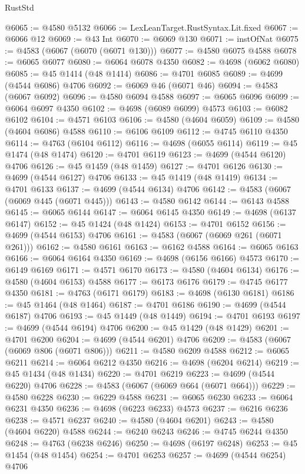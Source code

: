 \begin{lexlean}{RustStd}
\begin{coremodule}
@6065 := @4580 @5132
@6066 := LexLeanTarget.RustSyntax.Lit.fixed
@6067 := @6066 @12
@6069 := @43 Int
@6070 := @6069 @130
@6071 := instOfNat
@6075 := @4583 (@6067 (@6070 (@6071 @130)))
@6077 := @4580 @6075 @4588
@6078 := @6065 @6077
@6080 := @6064 @6078 @4350
@6082 := @4698 (@6062 @6080)
@6085 := @45 @1414 (@48 @1414)
@6086 := @4701 @6085
@6089 := @4699 (@4544 @6086) @4706
@6092 := @6069 @46 (@6071 @46)
@6094 := @4583 (@6067 @6092)
@6096 := @4580 @6094 @4588
@6097 := @6065 @6096
@6099 := @6064 @6097 @4350
@6102 := @4698 (@6089 @6099) @4573
@6103 := @6082 @6102
@6104 := @4571 @6103
@6106 := @4580 (@4604 @6059)
@6109 := @4580 (@4604 @6086) @4588
@6110 := @6106 @6109
@6112 := @4745 @6110 @4350
@6114 := @4763 (@6104 @6112)
@6116 := @4698 (@6055 @6114)
@6119 := @45 @1474 (@48 @1474)
@6120 := @4701 @6119
@6123 := @4699 (@4544 @6120) @4706
@6126 := @45 @1459 (@48 @1459)
@6127 := @4701 @6126
@6130 := @4699 (@4544 @6127) @4706
@6133 := @45 @1419 (@48 @1419)
@6134 := @4701 @6133
@6137 := @4699 (@4544 @6134) @4706
@6142 := @4583 (@6067 (@6069 @445 (@6071 @445)))
@6143 := @4580 @6142
@6144 := @6143 @4588
@6145 := @6065 @6144
@6147 := @6064 @6145 @4350
@6149 := @4698 (@6137 @6147)
@6152 := @45 @1424 (@48 @1424)
@6153 := @4701 @6152
@6156 := @4699 (@4544 @6153) @4706
@6161 := @4583 (@6067 (@6069 @261 (@6071 @261)))
@6162 := @4580 @6161
@6163 := @6162 @4588
@6164 := @6065 @6163
@6166 := @6064 @6164 @4350
@6169 := @4698 (@6156 @6166) @4573
@6170 := @6149 @6169
@6171 := @4571 @6170
@6173 := @4580 (@4604 @6134)
@6176 := @4580 (@4604 @6153) @4588
@6177 := @6173 @6176
@6179 := @4745 @6177 @4350
@6181 := @4763 (@6171 @6179)
@6183 := @4698 (@6130 @6181)
@6186 := @45 @1464 (@48 @1464)
@6187 := @4701 @6186
@6190 := @4699 (@4544 @6187) @4706
@6193 := @45 @1449 (@48 @1449)
@6194 := @4701 @6193
@6197 := @4699 (@4544 @6194) @4706
@6200 := @45 @1429 (@48 @1429)
@6201 := @4701 @6200
@6204 := @4699 (@4544 @6201) @4706
@6209 := @4583 (@6067 (@6069 @806 (@6071 @806)))
@6211 := @4580 @6209 @4588
@6212 := @6065 @6211
@6214 := @6064 @6212 @4350
@6216 := @4698 (@6204 @6214)
@6219 := @45 @1434 (@48 @1434)
@6220 := @4701 @6219
@6223 := @4699 (@4544 @6220) @4706
@6228 := @4583 (@6067 (@6069 @664 (@6071 @664)))
@6229 := @4580 @6228
@6230 := @6229 @4588
@6231 := @6065 @6230
@6233 := @6064 @6231 @4350
@6236 := @4698 (@6223 @6233) @4573
@6237 := @6216 @6236
@6238 := @4571 @6237
@6240 := @4580 (@4604 @6201)
@6243 := @4580 (@4604 @6220) @4588
@6244 := @6240 @6243
@6246 := @4745 @6244 @4350
@6248 := @4763 (@6238 @6246)
@6250 := @4698 (@6197 @6248)
@6253 := @45 @1454 (@48 @1454)
@6254 := @4701 @6253
@6257 := @4699 (@4544 @6254) @4706

\end{coremodule}
\end{lexlean}
